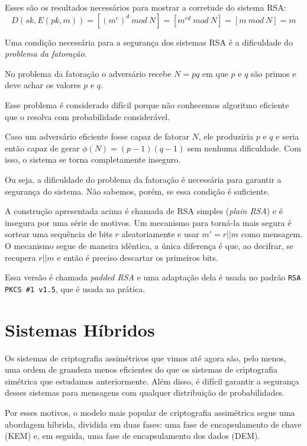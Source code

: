 Esses são os resultados necessários para mostrar a corretude do sistema RSA:
\begin{displaymath}
D(sk, E(pk, m)) = [(m^e)^d\ mod\ N] = [m^{ed}\ mod\ N] = [m\ mod\ N] = m
\end{displaymath}

Uma condição necessária para a segurança dos sistemas RSA é a dificuldade do {\em problema da fatoração}.

No problema da fatoração o adversário recebe $N = pq$ em que $p$ e $q$ são primos e deve achar os valores $p$ e $q$.

Esse problema é considerado difícil porque não conhecemos algoritmo eficiente que o resolva com probabilidade considerável.

Caso um adversário eficiente fosse capaz de fatorar $N$, ele produziria $p$ e $q$ e seria então capaz de gerar $\phi(N) = (p-1)(q-1)$ sem nenhuma dificuldade.
Com isso, o sistema se torna completamente inseguro.

Ou seja, a dificuldade do problema da fatoração é necessária para garantir a segurança do sistema. 
Não sabemos, porém, se essa condição é suficiente.

A construção apresentada acima é chamada de RSA simples ({\em plain RSA}) e é insegura por uma série de motivos.
Um mecanismo para torná-la mais segura é sortear uma sequência de bits $r$ aleatoriamente e usar $m' = r||m$ como mensagem.
O mecanismo segue de maneira idêntica, a única diferença é que, ao decifrar, se recupera $r||m$ e então é preciso descartar os primeiros bits.

Essa versão é chamada {\em padded RSA} e uma adaptação dela é usada no padrão {\tt RSA PKCS \#1 v1.5}, que é usada na prática.


\section{Sistemas Híbridos}
\label{sec:sistemas-hibridos}


Os sistemas de criptografia assimétricos que vimos até agora são, pelo menos, uma ordem de grandeza menos eficientes do que os sistemas de criptografia simétrica que estudamos anteriormente.
Além disso, é difícil garantir a segurança desses sistemas para mensagens com qualquer distribuição de probabilidades.

Por esses motivos, o modelo mais popular de criptografia assimétrica segue uma abordagem híbrida, dividida em duas fases:
uma fase de encapsulamento de chave (KEM) e, em seguida, uma fase de encapsulamento dos dados (DEM).


